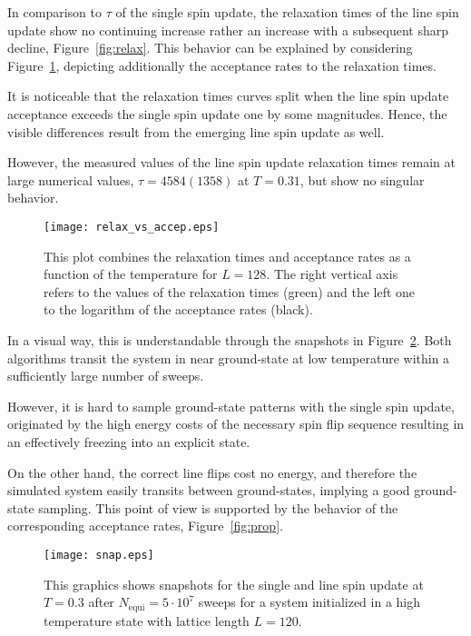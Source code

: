 In comparison to $\tau$ of the single spin update, the relaxation times of the line spin update show no continuing increase rather an increase 
with a subsequent sharp decline, Figure~\ref{fig:relax}. This behavior can be explained by considering Figure~\ref{fig:relax_vs_accep}, depicting 
additionally the acceptance rates to the relaxation times. 

It is noticeable that the relaxation times curves split when the line spin update 
acceptance exceeds the single spin update one by some magnitudes. Hence, the visible differences result from the emerging line spin update as well.


However, the measured values of the line spin update relaxation times remain at large numerical values, $\tau\!=\!4584(1358)$ at $T\!=\!0.31$, but 
show no singular behavior.
\\

\begin{figure}[!h]
  \texttt{[image: relax\_vs\_accep.eps]}
  \caption{This plot combines the relaxation times and acceptance rates as a function of the temperature for $L\!=\!128$. The right vertical axis refers to
  the values of the relaxation times (green) and the left one to the logarithm of the acceptance rates (black).}
  \label{fig:relax_vs_accep}
\end{figure}

In a visual way, this is understandable through the snapshots in Figure~\ref{fig:snap}. Both algorithms transit the 
system in near ground-state at low temperature within a sufficiently large number of sweeps. 

However, it is hard to sample ground-state patterns
with the single spin update, originated by the high energy costs of the necessary spin flip sequence resulting in an effectively freezing into an 
explicit state. 

On the other hand, the correct line flips cost no energy, and therefore the simulated system easily transits between ground-states, 
implying a good ground-state sampling. This point of view is supported by the behavior of the corresponding acceptance rates, Figure~\ref{fig:prop}.   

\begin{figure}[!h]
  \centering
  \texttt{[image: snap.eps]}
  \caption{This graphics shows snapshots for the single and line spin update at $T\!=\!0.3$ after $N_\mathrm{equi}\!=\!5\!\cdot\!10^{7}$ sweeps 
           for a system initialized in a high temperature state with lattice length $L\!=\!120$.}
  \label{fig:snap}
\end{figure}

\newpage




